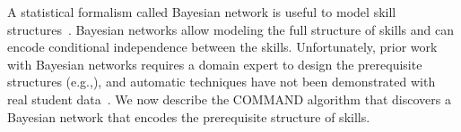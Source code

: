 \documentclass{edm_template}
\newcommand{\hl}[1]{\colorbox{yellow}{#1}}
\begin{document}

A statistical formalism called Bayesian network is useful to model skill structures~\cite{mislevy2000bayes}. 
Bayesian networks allow  modeling the full structure of skills and can encode conditional independence  between the skills.
Unfortunately, prior work with Bayesian networks requires a domain expert to design the prerequisite structures (e.g.,\cite{kaser2014beyond}),
and automatic techniques have not been demonstrated with real student data~\cite{scheines2014discovering}.
We now describe the COMMAND algorithm that discovers a Bayesian network that encodes the prerequisite structure of skills.

\end{document}
